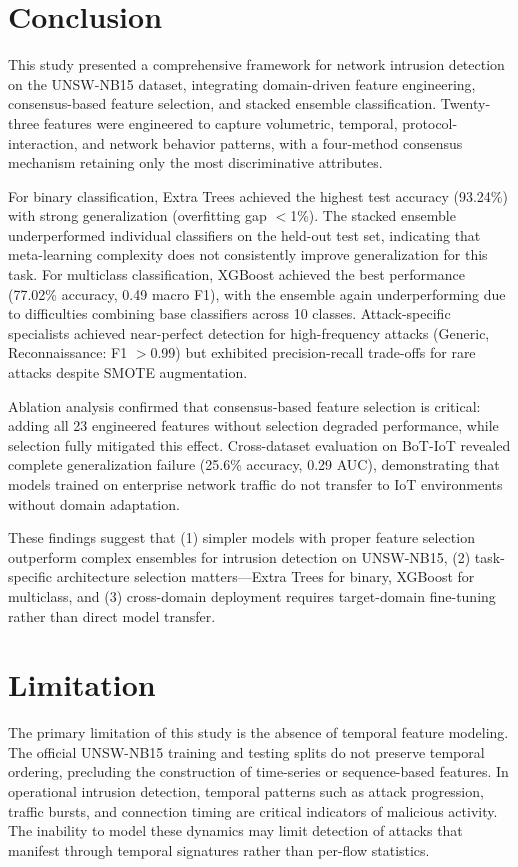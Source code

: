 \documentclass[pdflatex,sn-mathphys-num]{sn-jnl}
\theoremstyle{thmstyleone}%
\theoremstyle{thmstyletwo}%
\theoremstyle{thmstylethree}%
\begin{document}
\section{Conclusion}
This study presented a comprehensive framework for network intrusion detection on the UNSW-NB15 dataset, integrating domain-driven feature engineering, consensus-based feature selection, and stacked ensemble classification. Twenty-three features were engineered to capture volumetric, temporal, protocol-interaction, and network behavior patterns, with a four-method consensus mechanism retaining only the most discriminative attributes.

For binary classification, Extra Trees achieved the highest test accuracy (93.24\%) with strong generalization (overfitting gap $<$1\%). The stacked ensemble underperformed individual classifiers on the held-out test set, indicating that meta-learning complexity does not consistently improve generalization for this task. For multiclass classification, XGBoost achieved the best performance (77.02\% accuracy, 0.49 macro F1), with the ensemble again underperforming due to difficulties combining base classifiers across 10 classes. Attack-specific specialists achieved near-perfect detection for high-frequency attacks (Generic, Reconnaissance: F1 $>$0.99) but exhibited precision-recall trade-offs for rare attacks despite SMOTE augmentation.

Ablation analysis confirmed that consensus-based feature selection is critical: adding all 23 engineered features without selection degraded performance, while selection fully mitigated this effect. Cross-dataset evaluation on BoT-IoT revealed complete generalization failure (25.6\% accuracy, 0.29 AUC), demonstrating that models trained on enterprise network traffic do not transfer to IoT environments without domain adaptation.

These findings suggest that (1) simpler models with proper feature selection outperform complex ensembles for intrusion detection on UNSW-NB15, (2) task-specific architecture selection matters---Extra Trees for binary, XGBoost for multiclass, and (3) cross-domain deployment requires target-domain fine-tuning rather than direct model transfer.

\section{Limitation}
The primary limitation of this study is the absence of temporal feature modeling. The official UNSW-NB15 training and testing splits do not preserve temporal ordering, precluding the construction of time-series or sequence-based features. In operational intrusion detection, temporal patterns such as attack progression, traffic bursts, and connection timing are critical indicators of malicious activity. The inability to model these dynamics may limit detection of attacks that manifest through temporal signatures rather than per-flow statistics.
\end{document}
